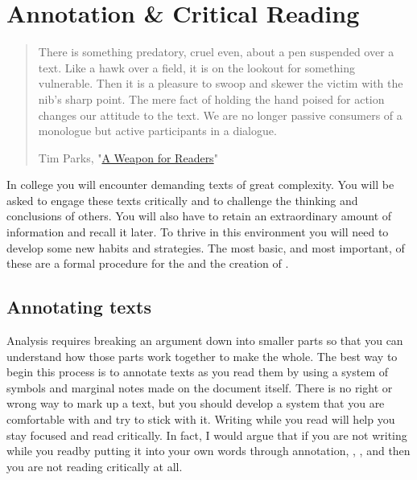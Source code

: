 


\chapter{Annotation \& Critical Reading}

\begin{quote} \small There is something predatory, cruel even, about a pen
suspended over a text. Like a hawk over a field, it is on the lookout for
something vulnerable. Then it is a pleasure to swoop and skewer the victim with
the nib’s sharp point. The mere fact of holding the hand poised for action
changes our attitude to the text. We are no longer passive consumers of a
monologue but active participants in a dialogue.

\textemdash Tim Parks,
"\href{http://www.nybooks.com/blogs/nyrblog/2014/dec/03/weapon-for-readers/}{A
Weapon for Readers}"

\end{quote}

In college you will encounter demanding texts of great complexity. You will be
asked to engage these texts critically and to challenge the thinking and conclusions of others. You will also have to retain an extraordinary amount of information and recall it later. To thrive in this environment you will need to develop some new habits and strategies. The most basic, and most important, of these are a formal procedure for the  and the creation of . 

\section{Annotating texts}

Analysis requires breaking an argument down into smaller parts so that you can
understand how those parts work together to make the whole. The best way to
begin this process is to annotate texts as you read them by using a system of symbols and marginal notes made on the document itself. There is no right or wrong way to mark up a text, but you should develop
a system that you are comfortable with and try to stick with it. Writing while
you read will help you stay focused and read critically. In fact, I would argue
that if you are not writing while you read\textemdash by putting it into your
own words through annotation, \hyperlink{summary}{\color{Ahrenge}{summary}}, \hyperlink{paraphrase}{\color{Ahrenge}{paraphrase}}, and \hyperlink{quotation}{\color{Ahrenge}{quotation}}\textemdash then you are not reading critically at all.

